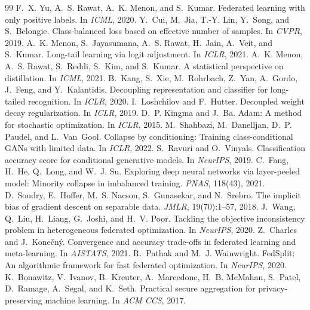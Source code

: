 \documentclass[10pt]{article}
\theoremstyle{plain}
\theoremstyle{definition}
\begin{document}
\begin{thebibliography}{99}
 F.~X. Yu, A.~S. Rawat, A.~K. Menon, and S.~Kumar. Federated learning with only positive labels. In \emph{ICML}, 2020.
 Y.~Cui, M.~Jia, T.-Y. Lin, Y.~Song, and S.~Belongie. Class-balanced loss based on effective number of samples. In \emph{CVPR}, 2019.
 A.~K. Menon, S.~Jayasumana, A.~S. Rawat, H.~Jain, A.~Veit, and S.~Kumar. Long-tail learning via logit adjustment. In \emph{ICLR}, 2021.
 A.~K. Menon, A.~S. Rawat, S.~Reddi, S.~Kim, and S.~Kumar. A statistical perspective on distillation. In \emph{ICML}, 2021.
 B.~Kang, S.~Xie, M.~Rohrbach, Z.~Yan, A.~Gordo, J.~Feng, and Y.~Kalantidis. Decoupling representation and classifier for long-tailed recognition. In \emph{ICLR}, 2020.
 I.~Loshchilov and F.~Hutter. Decoupled weight decay regularization. In \emph{ICLR}, 2019.
 D.~P. Kingma and J.~Ba. Adam: A method for stochastic optimization. In \emph{ICLR}, 2015.
 M.~Shahbazi, M.~Danelljan, D.~P. Paudel, and L.~Van~Gool. Collapse by conditioning: Training class-conditional GANs with limited data. In \emph{ICLR}, 2022.
 S.~Ravuri and O.~Vinyals. Classification accuracy score for conditional generative models. In \emph{NeurIPS}, 2019.
 C.~Fang, H.~He, Q.~Long, and W.~J. Su. Exploring deep neural networks via layer-peeled model: Minority collapse in imbalanced training. \emph{PNAS}, 118(43), 2021.
 D.~Soudry, E.~Hoffer, M.~S. Nacson, S.~Gunasekar, and N.~Srebro. The implicit bias of gradient descent on separable data. \emph{JMLR}, 19(70):1--57, 2018.
 J.~Wang, Q.~Liu, H.~Liang, G.~Joshi, and H.~V. Poor. Tackling the objective inconsistency problem in heterogeneous federated optimization. In \emph{NeurIPS}, 2020.
 Z.~Charles and J.~Kone{\v{c}}n{\'y}. Convergence and accuracy trade-offs in federated learning and meta-learning. In \emph{AISTATS}, 2021.
 R.~Pathak and M.~J. Wainwright. FedSplit: An algorithmic framework for fast federated optimization. In \emph{NeurIPS}, 2020.
 K.~Bonawitz, V.~Ivanov, B.~Kreuter, A.~Marcedone, H.~B. McMahan, S.~Patel, D.~Ramage, A.~Segal, and K.~Seth. Practical secure aggregation for privacy-preserving machine learning. In \emph{ACM CCS}, 2017.

\end{thebibliography}
\end{document}

